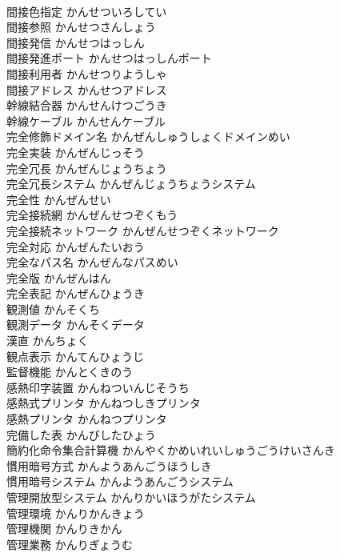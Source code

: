\documentclass[8pt]{extreport}
\begin{document}
\begin{CJK}{UTF8}{min}
\\	間接色指定	かんせついろしてい	
\\	間接参照	かんせつさんしょう	
\\	間接発信	かんせつはっしん	
\\	間接発進ポート	かんせつはっしんポート	
\\	間接利用者	かんせつりようしゃ	
\\	間接アドレス	かんせつアドレス	
\\	幹線結合器	かんせんけつごうき	
\\	幹線ケーブル	かんせんケーブル	
\\	完全修飾ドメイン名	かんぜんしゅうしょくドメインめい	
\\	完全実装	かんぜんじっそう	
\\	完全冗長	かんぜんじょうちょう	
\\	完全冗長システム	かんぜんじょうちょうシステム	
\\	完全性	かんぜんせい	
\\	完全接続網	かんぜんせつぞくもう	
\\	完全接続ネットワーク	かんぜんせつぞくネットワーク	
\\	完全対応	かんぜんたいおう	
\\	完全なパス名	かんぜんなパスめい	
\\	完全版	かんぜんはん	
\\	完全表記	かんぜんひょうき	
\\	観測値	かんそくち	
\\	観測データ	かんそくデータ	
\\	漢直	かんちょく	
\\	観点表示	かんてんひょうじ	
\\	監督機能	かんとくきのう	
\\	感熱印字装置	かんねついんじそうち	
\\	感熱式プリンタ	かんねつしきプリンタ	
\\	感熱プリンタ	かんねつプリンタ	
\\	完備した表	かんびしたひょう	
\\	簡約化命令集合計算機	かんやくかめいれいしゅうごうけいさんき	
\\	慣用暗号方式	かんようあんごうほうしき	
\\	慣用暗号システム	かんようあんごうシステム	
\\	管理開放型システム	かんりかいほうがたシステム	
\\	管理環境	かんりかんきょう	
\\	管理機関	かんりきかん	
\\	管理業務	かんりぎょうむ	

\end{CJK}
\end{document}
